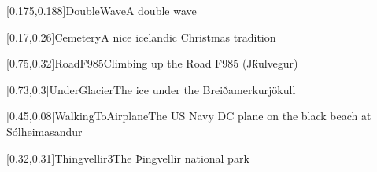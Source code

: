 



\graphicspath{{Figures/}{Figures/Iceland/}}


\subtitle{Day 5}
\date{30.10.2020}


    
    [0.175,0.188]{DoubleWave}{A double wave}
    
    
    [0.17,0.26]{Cemetery}{A nice icelandic Christmas tradition}
    
    [0.75,0.32]{RoadF985}{Climbing up the Road F985 (J\"kulvegur)}
    
    [0.73,0.3]{UnderGlacier}{The ice under the Breiðamerkurj\"okull}
    
    [0.45,0.08]{WalkingToAirplane}{The US Navy DC plane on the black beach at Sólheimasandur}
    
    [0.32,0.31]{Thingvellir3}{The Þingvellir national park}
    


